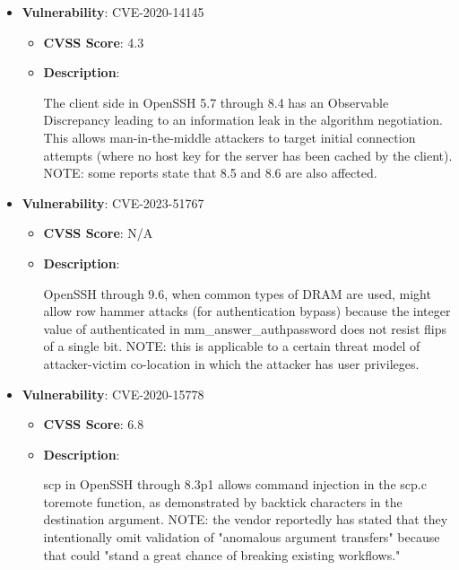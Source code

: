 \documentclass{article}
\begin{document}
\begin{itemize}
        \item \textbf{Vulnerability}: CVE-2020-14145
        \begin{itemize}
            \item \textbf{CVSS Score}:  4.3 
            \item \textbf{Description}:
            \parbox[t]{0.9\linewidth}{
                \ttfamily The client side in OpenSSH 5.7 through 8.4 has an Observable Discrepancy leading to an information leak in the algorithm negotiation. This allows man-in-the-middle attackers to target initial connection attempts (where no host key for the server has been cached by the client). NOTE: some reports state that 8.5 and 8.6 are also affected.
            }
        \end{itemize}
    
        \item \textbf{Vulnerability}: CVE-2023-51767
        \begin{itemize}
            \item \textbf{CVSS Score}:  N/A 
            \item \textbf{Description}:
            \parbox[t]{0.9\linewidth}{
                \ttfamily OpenSSH through 9.6, when common types of DRAM are used, might allow row hammer attacks (for authentication bypass) because the integer value of authenticated in mm\_answer\_authpassword does not resist flips of a single bit. NOTE: this is applicable to a certain threat model of attacker-victim co-location in which the attacker has user privileges.
            }
        \end{itemize}
    
        \item \textbf{Vulnerability}: CVE-2020-15778
        \begin{itemize}
            \item \textbf{CVSS Score}:  6.8 
            \item \textbf{Description}:
            \parbox[t]{0.9\linewidth}{
                \ttfamily scp in OpenSSH through 8.3p1 allows command injection in the scp.c toremote function, as demonstrated by backtick characters in the destination argument. NOTE: the vendor reportedly has stated that they intentionally omit validation of "anomalous argument transfers" because that could "stand a great chance of breaking existing workflows."
            }
        \end{itemize}
    

\end{itemize}
\end{document}
